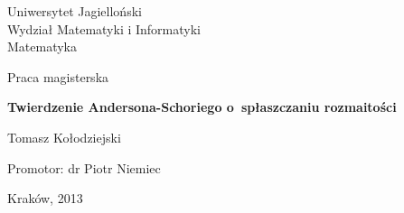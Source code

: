\pagestyle{empty}

\noindent
\begin{center}
    \Large
    Uniwersytet Jagielloński\\
    Wydział Matematyki i Informatyki\\
    Matematyka
\end{center}

\vfill\vfill
\begin{center}
    \large
    Praca magisterska
\end{center}

\vfill
\begin{center}
    \Huge\bfseries
    Twierdzenie Andersona-Schoriego o~spłaszczaniu rozmaitości
\end{center}

\vfill
\begin{center}
    \Huge
    Tomasz Kołodziejski
\end{center}

\vfill\vfill\vfill
\begin{center}
    \Large
    Promotor: dr Piotr Niemiec
\end{center}

\vfill
\begin{center}
\large
    Kraków, 2013
\end{center}

\cleardoublepage
\pagestyle{headings}
\tableofcontents
